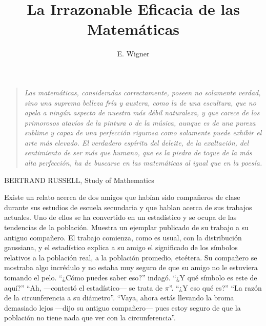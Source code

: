 \documentclass[a4paper, 12pt]{article}
\title{La Irrazonable Eficacia de las Matemáticas}
\author{E. Wigner}
\date{}
\begin{document}
\begin{tcolorbox}[colback=blue!5!white,colframe=blue!75!black]

\vspace{-1.8cm}
\textbf \maketitle

\end{tcolorbox}

\bigskip


\begin{quote}

{\it Las matemáticas, consideradas correctamente, poseen no solamente verdad, sino una suprema belleza fría y austera, como la de una escultura, que no apela a ningún aspecto de nuestra más débil naturaleza, y que carece de los primorosos atavíos de la pintura o de la música, aunque es de una pureza sublime y capaz de una perfección rigurosa como solamente puede exhibir el arte más elevado. El verdadero espíritu del deleite, de la exaltación, del sentimiento de ser más que humano, que es la piedra de toque de la más alta perfección, ha de buscarse en las matemáticas al igual que en la poesía.}

\end{quote}

\hfill BERTRAND RUSSELL, Study of Mathematics


\bigskip


Existe un relato acerca de dos amigos que habían sido compañeros de clase durante sus estudios de escuela secundaria y que hablan acerca de sus trabajos actuales. Uno de ellos se ha convertido en un estadístico y se ocupa de las tendencias de la población. Muestra un ejemplar publicado de su trabajo a su antiguo compañero. El trabajo comienza, como es usual, con la distribución gaussiana, y el estadístico explica a su amigo el significado de los símbolos relativos a la población real, a la población promedio, etcétera. Su compañero se mostraba algo incrédulo y no estaba muy seguro de que su amigo no le estuviera tomando el pelo. ``¿Cómo puedes saber eso?'' indagó. ``¿Y qué símbolo es este de aquí?'' ``Ah, ---contestó el estadístico--- se trata de $\pi$''. ``¿Y eso qué es?'' ``La razón de la circunferencia a su diámetro''. ``Vaya, ahora estás llevando la broma demasiado lejos ---dijo su antiguo compañero--- pues estoy seguro de que la población no tiene nada que ver con la circunferencia''.
\end{document}
